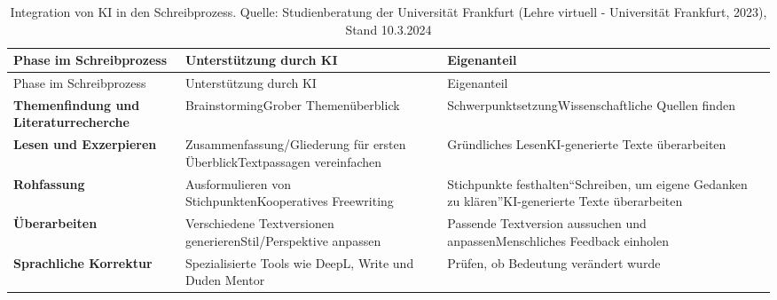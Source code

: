 \documentclass[
  ngerman,
  letterpaper,
  DIV=11]{scrreprt}
\begin{document}
\begin{longtable}[]{@{}
  >{\raggedright\arraybackslash}p{}
  >{\raggedright\arraybackslash}p{}
  >{\raggedright\arraybackslash}p{}@{}}
\caption{Integration von KI in den Schreibprozess. Quelle:
Studienberatung der Universität Frankfurt (Lehre virtuell - Universität
Frankfurt, 2023), Stand
10.3.2024}\label{tbl-writing-process}\tabularnewline
\toprule\noalign{}
\begin{minipage}[b]{\linewidth}\raggedright
Phase im Schreibprozess
\end{minipage} & \begin{minipage}[b]{\linewidth}\raggedright
Unterstützung durch KI
\end{minipage} & \begin{minipage}[b]{\linewidth}\raggedright
Eigenanteil
\end{minipage} \\
\midrule\noalign{}
\endfirsthead
\toprule\noalign{}
\begin{minipage}[b]{\linewidth}\raggedright
Phase im Schreibprozess
\end{minipage} & \begin{minipage}[b]{\linewidth}\raggedright
Unterstützung durch KI
\end{minipage} & \begin{minipage}[b]{\linewidth}\raggedright
Eigenanteil
\end{minipage} \\
\midrule\noalign{}
\endhead
\bottomrule\noalign{}
\endlastfoot
\textbf{Themenfindung und Literaturrecherche} & BrainstormingGrober
Themenüberblick & SchwerpunktsetzungWissenschaftliche Quellen finden \\
\textbf{Lesen und Exzerpieren} & Zusammenfassung/Gliederung für ersten
ÜberblickTextpassagen vereinfachen & Gründliches LesenKI-generierte
Texte überarbeiten \\
\textbf{Rohfassung} & Ausformulieren von StichpunktenKooperatives
Freewriting & Stichpunkte festhalten``Schreiben, um eigene Gedanken zu
klären''KI-generierte Texte überarbeiten \\
\textbf{Überarbeiten} & Verschiedene Textversionen
generierenStil/Perspektive anpassen & Passende Textversion aussuchen und
anpassenMenschliches Feedback einholen \\
\textbf{Sprachliche Korrektur} & Spezialisierte Tools wie DeepL, Write
und Duden Mentor & Prüfen, ob Bedeutung verändert wurde \\
\end{longtable}
\end{document}
